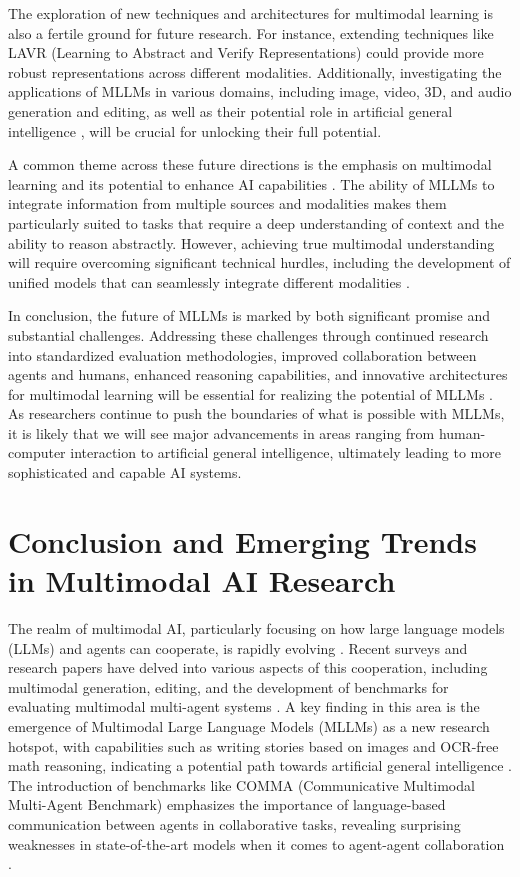 \documentclass[conference]{IEEEtran}
\begin{document}
The exploration of new techniques and architectures for multimodal learning is also a fertile ground for future research. For instance, extending techniques like LAVR (Learning to Abstract and Verify Representations) \cite{b11} could provide more robust representations across different modalities. Additionally, investigating the applications of MLLMs in various domains, including image, video, 3D, and audio generation and editing, as well as their potential role in artificial general intelligence \cite{b12}, will be crucial for unlocking their full potential.

A common theme across these future directions is the emphasis on multimodal learning and its potential to enhance AI capabilities \cite{b13}. The ability of MLLMs to integrate information from multiple sources and modalities makes them particularly suited to tasks that require a deep understanding of context and the ability to reason abstractly. However, achieving true multimodal understanding will require overcoming significant technical hurdles, including the development of unified models that can seamlessly integrate different modalities \cite{b14}.

In conclusion, the future of MLLMs is marked by both significant promise and substantial challenges. Addressing these challenges through continued research into standardized evaluation methodologies, improved collaboration between agents and humans, enhanced reasoning capabilities, and innovative architectures for multimodal learning will be essential for realizing the potential of MLLMs \cite{b15}. As researchers continue to push the boundaries of what is possible with MLLMs, it is likely that we will see major advancements in areas ranging from human-computer interaction to artificial general intelligence, ultimately leading to more sophisticated and capable AI systems.

\section{Conclusion and Emerging Trends in Multimodal AI Research}
The realm of multimodal AI, particularly focusing on how large language models (LLMs) and agents can cooperate, is rapidly evolving \cite{b1}. Recent surveys and research papers have delved into various aspects of this cooperation, including multimodal generation, editing, and the development of benchmarks for evaluating multimodal multi-agent systems \cite{b2}. A key finding in this area is the emergence of Multimodal Large Language Models (MLLMs) as a new research hotspot, with capabilities such as writing stories based on images and OCR-free math reasoning, indicating a potential path towards artificial general intelligence \cite{b3}. The introduction of benchmarks like COMMA (Communicative Multimodal Multi-Agent Benchmark) emphasizes the importance of language-based communication between agents in collaborative tasks, revealing surprising weaknesses in state-of-the-art models when it comes to agent-agent collaboration \cite{b4}.
\end{document}
